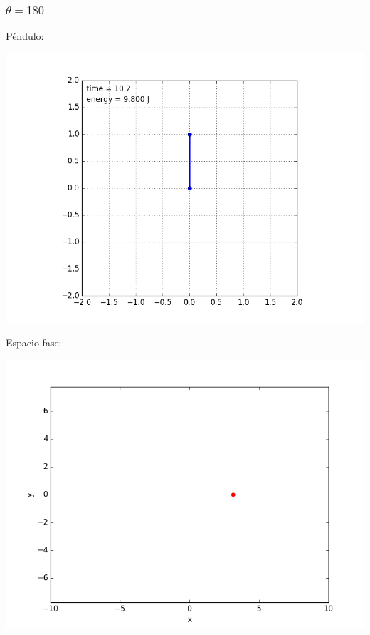 \documentclass[12pt,letterpaper]{article}
\begin{document}
\subsubsection*{$\theta = 180$}
Péndulo:
\begin{center}
\includegraphics[scale=0.3]{180.png}
\end{center}
Espacio fase:
\begin{center}
\includegraphics[scale=0.3]{1801.png}
\end{center}
\end{document}
